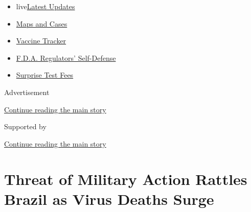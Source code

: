 \begin{itemize}
\tightlist
\item
  live\href{https://www.nytimes3xbfgragh.onion/2020/09/11/world/covid-19-coronavirus.html?name=styln-coronavirus-national\&region=TOP_BANNER\&block=storyline_menu_recirc\&action=click\&pgtype=Article\&impression_id=22258f51-f4bb-11ea-ad23-071b6226df98\&variant=undefined}{Latest
  Updates}
\item
  \href{https://www.nytimes3xbfgragh.onion/interactive/2020/us/coronavirus-us-cases.html?name=styln-coronavirus-national\&region=TOP_BANNER\&block=storyline_menu_recirc\&action=click\&pgtype=Article\&impression_id=22258f52-f4bb-11ea-ad23-071b6226df98\&variant=undefined}{Maps
  and Cases}
\item
  \href{https://www.nytimes3xbfgragh.onion/interactive/2020/science/coronavirus-vaccine-tracker.html?name=styln-coronavirus-national\&region=TOP_BANNER\&block=storyline_menu_recirc\&action=click\&pgtype=Article\&impression_id=22258f53-f4bb-11ea-ad23-071b6226df98\&variant=undefined}{Vaccine
  Tracker}
\item
  \href{https://www.nytimes3xbfgragh.onion/2020/09/10/us/politics/fda-coronavirus-vaccine.html?name=styln-coronavirus-national\&region=TOP_BANNER\&block=storyline_menu_recirc\&action=click\&pgtype=Article\&impression_id=2225b660-f4bb-11ea-ad23-071b6226df98\&variant=undefined}{F.D.A.
  Regulators' Self-Defense}
\item
  \href{https://www.nytimes3xbfgragh.onion/2020/09/09/upshot/coronavirus-surprise-test-fees.html?name=styln-coronavirus-national\&region=TOP_BANNER\&block=storyline_menu_recirc\&action=click\&pgtype=Article\&impression_id=2225b661-f4bb-11ea-ad23-071b6226df98\&variant=undefined}{Surprise
  Test Fees}
\end{itemize}

Advertisement

\protect\hyperlink{after-top}{Continue reading the main story}

Supported by

\protect\hyperlink{after-sponsor}{Continue reading the main story}

\hypertarget{threat-of-military-action-rattles-brazil-as-virus-deaths-surge}{%
\section{Threat of Military Action Rattles Brazil as Virus Deaths
Surge}\label{threat-of-military-action-rattles-brazil-as-virus-deaths-surge}}

